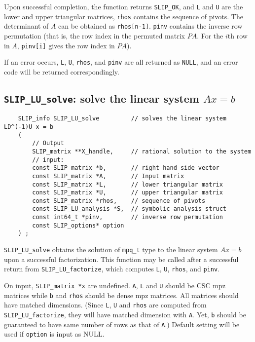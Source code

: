 \documentclass[12pt]{article}
\theoremstyle{definition}
\begin{document}
Upon successful completion, the function returns \verb|SLIP_OK|, and
\verb|L| and \verb|U| are the lower and upper triangular matrices,
\verb|rhos| contains the sequence of pivots. The determinant of $A$ can be
obtained as \verb|rhos[n-1]|. \verb|pinv| contains the inverse row permutation
(that is, the row index in the permuted matrix $PA$. For the $i$th row in $A$,
\verb|pinv[i]| gives the row index in $PA$). 

If an error occurs, \verb|L|, \verb|U|, \verb|rhos|, and \verb|pinv| are all
returned as \verb|NULL|, and an error code will be returned correspondingly.

\cprotect\subsection{\verb|SLIP_LU_solve|: solve the linear system $Ax=b$}
\label{ss:SLIP_LU_solve}

\begin{mdframed}[userdefinedwidth=6in]
{\footnotesize
\begin{verbatim}
    SLIP_info SLIP_LU_solve         // solves the linear system LD^(-1)U x = b
    (
        // Output
        SLIP_matrix **X_handle,     // rational solution to the system
        // input:
        const SLIP_matrix *b,       // right hand side vector
        const SLIP_matrix *A,       // Input matrix
        const SLIP_matrix *L,       // lower triangular matrix
        const SLIP_matrix *U,       // upper triangular matrix
        const SLIP_matrix *rhos,    // sequence of pivots
        const SLIP_LU_analysis *S,  // symbolic analysis struct
        const int64_t *pinv,        // inverse row permutation
        const SLIP_options* option
    ) ;
\end{verbatim}
} \end{mdframed}

\verb|SLIP_LU_solve| obtains the solution of \verb|mpq_t| type to the linear
system $Ax=b$ upon a successful factorization.  This function may be called
after a successful return from \verb|SLIP_LU_factorize|, which computes
\verb|L|, \verb|U|, \verb|rhos|, and \verb|pinv|. 

On input, \verb|SLIP_matrix *x| are undefined. \verb|A|, \verb|L| and \verb|U|
should be CSC mpz matrices while \verb|b| and \verb|rhos| should be dense mpz
matrices. All matrices should have matched dimensions. (Since \verb|L|, \verb|U|
and \verb|rhos| are computed from \verb|SLIP_LU_factorize|, they will have
matched dimension with \verb|A|. Yet, \verb|b| should be guaranteed to have
same number of rows as that of \verb|A|.) Default setting will be used if
\verb|option| is input as NULL.
\end{document}
